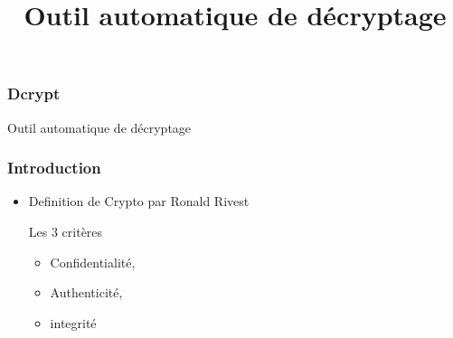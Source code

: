 \documentclass[10pt,xcolor=table]{beamer}
\title{Outil automatique de décryptage}
\begin{document}
\begin{frame}
  \frametitle{Dcrypt}
\begin{center}
\Huge {Outil automatique de décryptage}
\end{center}
\end{frame}


\begin{frame}
  \frametitle{Introduction}

  \begin{itemize}[<+->]
  \item Definition de Crypto par Ronald Rivest
  
  \begin{block}{Les 3 critères}
    \begin{itemize}
    \item Confidentialité,
    \item Authenticité,
    \item integrité
    \end{itemize}
  \end{block}
  \end{itemize}

\end{frame}
\end{document}
